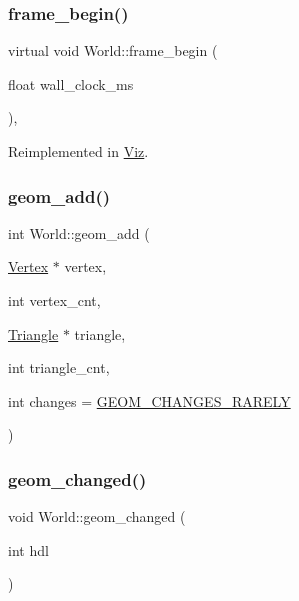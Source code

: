 \mbox{\label{classWorld_a31a7f317338492f86ad62111c8869a98}} 
\subsubsection{\texorpdfstring{frame\+\_\+begin()}{frame\_begin()}}
{\footnotesize\ttfamily virtual void World\+::frame\+\_\+begin (\begin{DoxyParamCaption}\item[{float}]{wall\+\_\+clock\+\_\+ms }\end{DoxyParamCaption})\hspace{0.3cm}{\ttfamily [protected]}, {\ttfamily [virtual]}}



Reimplemented in \mbox{\hyperlink{classViz_a29d2f5a0af409c50243da79ada86adad}{Viz}}.

\mbox{\label{classWorld_acc924235d8d421ecd32d8c7b813b486e}} 
\subsubsection{\texorpdfstring{geom\+\_\+add()}{geom\_add()}}
{\footnotesize\ttfamily int World\+::geom\+\_\+add (\begin{DoxyParamCaption}\item[{\mbox{\hyperlink{classVertex}{Vertex}} $\ast$}]{vertex,  }\item[{int}]{vertex\+\_\+cnt,  }\item[{\mbox{\hyperlink{classTriangle}{Triangle}} $\ast$}]{triangle,  }\item[{int}]{triangle\+\_\+cnt,  }\item[{int}]{changes = {\ttfamily \mbox{\hyperlink{World_8h_adf764cbdea00d65edcd07bb9953ad2b7afd62cb9ff74dd66a2597e9c31e205cba}{G\+E\+O\+M\+\_\+\+C\+H\+A\+N\+G\+E\+S\+\_\+\+R\+A\+R\+E\+LY}}} }\end{DoxyParamCaption})}

\mbox{\label{classWorld_ac3b4194ef3dcc248f00070c8c9d9f27d}} 
\subsubsection{\texorpdfstring{geom\+\_\+changed()}{geom\_changed()}}
{\footnotesize\ttfamily void World\+::geom\+\_\+changed (\begin{DoxyParamCaption}\item[{int}]{hdl }\end{DoxyParamCaption})}

